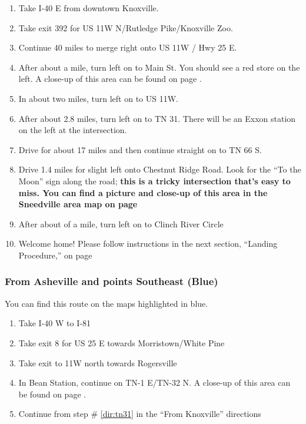 \begin{enumerate}[noitemsep]
	\item Take I-40 E from downtown Knoxville.
    \item Take exit 392 for US 11W N/Rutledge Pike/Knoxville Zoo.
    \item Continue 40 miles to merge right onto US 11W / Hwy 25 E.
    \item After about a mile, turn left on to Main St.  You should see a red store on the left. A close-up of this area can be found on page \pageref{image:beanstation}.
    \item In about two miles, turn left on to US 11W.
    \item After about 2.8 miles, turn left on to TN 31.  There will be an Exxon station on the left at the intersection. \label{dir:tn31}
    \item Drive for about 17 miles and then continue straight on to TN 66 S.
    \item Drive 1.4 miles for slight left onto Chestnut Ridge Road.  Look for the ``To the Moon'' sign along the road; \textbf{this is a tricky intersection that's easy to miss. \label{dir:chestnutridge} You can find a picture and close-up of this area in the Sneedville area map on page \pageref{image:sneedville}}
    \item After about  of a mile, turn left on to Clinch River Circle
    \item Welcome home!  Please follow instructions in the next section, ``Landing Procedure,'' on page \pageref{sec:parking}
\end{enumerate}


\clearpage
\subsubsection*{From Asheville and points Southeast (Blue)}
You can find this route on the maps highlighted in blue.

\begin{enumerate}[noitemsep]
	\item Take I-40 W to I-81
    \item Take exit 8 for US 25 E towards Morristown/White Pine
    \item Take exit to 11W north towards Rogersville
    \item In Bean Station, continue on TN-1 E/TN-32 N. A close-up of this area can be found on page \pageref{image:beanstation}.
    \item Continue from step \# \ref{dir:tn31} in the ``From Knoxville'' directions
\end{enumerate}


